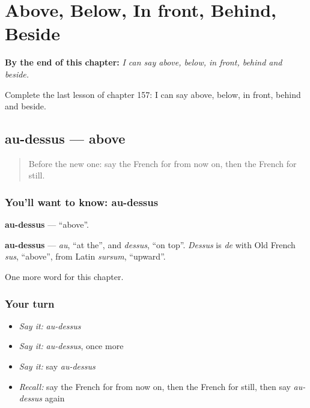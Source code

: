 
\chapter{Above, Below, In front, Behind, Beside}
\label{ch:fr-above-below-in-front-behind-beside}

\begin{chapteropening}
\textbf{By the end of this chapter:} \emph{I can say above, below, in front, behind and beside.}

Complete the last lesson of chapter 157: I can say above, below, in front, behind and beside.
\end{chapteropening}

\section[au-dessus]{au-dessus — above}

\label{lesson:FR-C157-au-dessus}



\begin{quote}
Before the new one: say the French for from now on, then the French for still.
\end{quote}

\subsection*{You'll want to know: au-dessus}
\textbf{au-dessus} — \textquotedblleft{}above\textquotedblright{}.

\begin{cousinweb}
\textbf{au-dessus} — \emph{au}, \textquotedblleft{}at the\textquotedblright{}, and \emph{dessus}, \textquotedblleft{}on top\textquotedblright{}. \emph{Dessus} is \emph{de} with Old French \emph{sus}, \textquotedblleft{}above\textquotedblright{}, from Latin \emph{sursum}, \textquotedblleft{}upward\textquotedblright{}.
\end{cousinweb}

\begin{grammarlens}[title={What you've built}]
One more word for this chapter.
\end{grammarlens}

\subsection*{Your turn}
\begin{itemize}
\raggedright
  \item \emph{Say it:} \emph{au-dessus}
  \item \emph{Say it:} \emph{au-dessus}, once more
  \item \emph{Say it:} say \emph{au-dessus}
  \item \emph{Recall:} say the French for from now on, then the French for still, then say \emph{au-dessus} again
\end{itemize}

